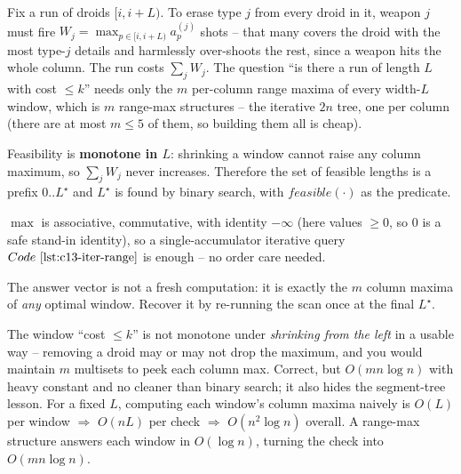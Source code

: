 Fix a run of droids \([i, i{+}L)\).  To erase type \(j\) from every droid in it,
weapon \(j\) must fire \(W_j=\max_{p\in[i,i{+}L)} a_p^{(j)}\) shots -- that many
covers the droid with the most type-\(j\) details and harmlessly over-shoots the
rest, since a weapon hits the whole column.  The run costs \(\sum_j W_j\).  The
question ``is there a run of length \(L\) with cost \(\le k\)'' needs only the
\(m\) per-column range maxima of every width-\(L\) window, which is \(m\)
range-max structures -- the iterative \(2n\) tree, one per column (there are at
most \(m\le5\) of them, so building them all is cheap).

\begin{observation}
Feasibility is \textbf{monotone in \(L\)}: shrinking a window cannot raise any
column maximum, so \(\sum_j W_j\) never increases.  Therefore the set of feasible
lengths is a prefix \(0..L^\star\) and \(L^\star\) is found by binary search,
with \(\mathit{feasible}(\cdot)\) as the predicate.
\end{observation}
\begin{observation}
\(\max\) is associative, commutative, with identity \(-\infty\) (here values
\(\ge 0\), so \(0\) is a safe stand-in identity), so a single-accumulator
iterative query \(\coderef{c13-iter-range}\) is enough -- no order care needed.
\end{observation}
\begin{observation}
The answer vector is not a fresh computation: it is exactly the \(m\) column
maxima of \emph{any} optimal window.  Recover it by re-running the scan once at
the final \(L^\star\).
\end{observation}

\begin{thinkbox}
{The window ``cost \(\le k\)'' is not monotone under \emph{shrinking from the
left} in a usable way -- removing a droid may or may not drop the maximum, and you
would maintain \(m\) multisets to peek each column max.  Correct, but \(O(mn\log
n)\) with heavy constant and no cleaner than binary search; it also hides the
segment-tree lesson.}
{For a fixed \(L\), computing each window's column maxima naively is
\(O(L)\) per window \(\Rightarrow\) \(O(nL)\) per check \(\Rightarrow\)
\(O(n^2\log n)\) overall.  A range-max structure answers each window in
\(O(\log n)\), turning the check into \(O(mn\log n)\).}
\end{thinkbox}


